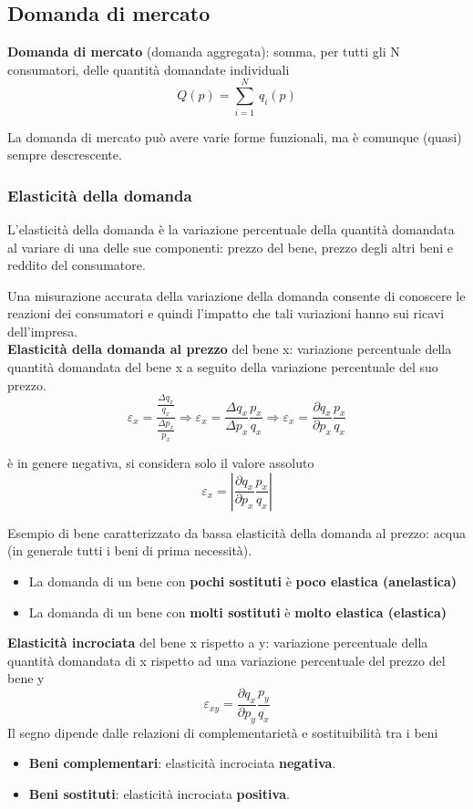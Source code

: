 \documentclass[../main.tex]{subfiles}
\begin{document}
\subsection{Domanda di mercato}

\textbf{Domanda di mercato} (domanda aggregata): somma, per tutti gli N consumatori, delle quantità domandate individuali
$$Q(p) = \sum_{i=1}^N\,q_i(p)$$

La domanda di mercato può avere varie forme funzionali, ma è comunque (quasi) sempre descrescente.

\subsubsection{Elasticità della domanda}

L'elasticità della domanda è la variazione percentuale della quantità domandata al variare di una delle sue componenti: prezzo del bene, prezzo degli altri beni e reddito del consumatore.

Una misurazione accurata della variazione della domanda consente di conoscere le reazioni dei consumatori e quindi l'impatto che tali variazioni hanno sui ricavi dell'impresa.\\

\textbf{Elasticità della domanda al prezzo} del bene x: variazione percentuale della quantità domandata del bene x a seguito della variazione percentuale del suo prezzo.
$$
	\varepsilon_x=\frac{\frac{\Delta q_x}{q_x}}{\frac{\Delta p_x}{p_x}}\Rightarrow\varepsilon_x=\frac{\Delta q_x}{\Delta p_x}\frac{p_x}{q_x}\Rightarrow\varepsilon_x=\frac{\partial q_x}{\partial p_x}\frac{p_x}{q_x}
$$

è in genere negativa, si considera solo il valore assoluto
$$
	\varepsilon_x = |\frac{\partial q_x}{\partial p_x}\frac{p_x}{q_x}|
$$

Esempio di bene caratterizzato da bassa elasticità della domanda al prezzo: acqua (in generale tutti i beni di prima necessità).

\begin{itemize}
	\item La domanda di un bene con \textbf{pochi sostituti} è \textbf{poco elastica (anelastica)}
	\item La domanda di un bene con \textbf{molti sostituti} è \textbf{molto elastica (elastica)}\\
\end{itemize}

\textbf{Elasticità incrociata} del bene x rispetto a y: variazione percentuale della quantità domandata di x rispetto ad una variazione percentuale del prezzo del bene y
$$\varepsilon_{xy}=\frac{\partial q_x}{\partial p_y}\frac{p_y}{q_x}$$
Il segno dipende dalle relazioni di complementarietà e sostituibilità tra i beni
\begin{itemize}
	\item \textbf{Beni complementari}: elasticità incrociata \textbf{negativa}.
	\item \textbf{Beni sostituti}: elasticità incrociata \textbf{positiva}.\\
\end{itemize}
\end{document}

